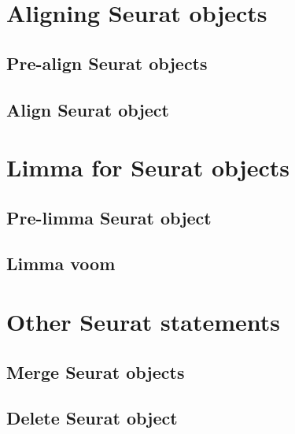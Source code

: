 \section{Aligning Seurat objects}
\subsection{Pre-align Seurat objects}
\subsection{Align Seurat object}

\section{Limma for Seurat objects}\label{sec:LimmaSeurat}
\subsection{Pre-limma Seurat object}
\subsection{Limma voom}

\section{Other Seurat statements}\label{sec:OtherSeuratStatements}
\subsection{Merge Seurat objects}
\subsection{Delete Seurat object}
